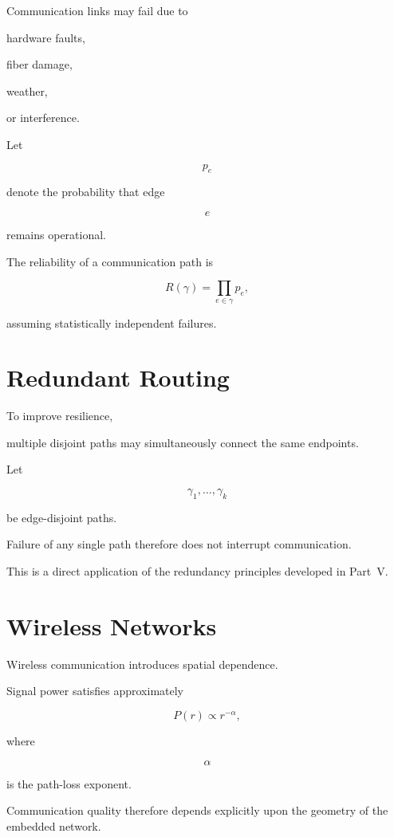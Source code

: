 \documentclass[11pt,fleqn]{book}
\numberwithin{equation}{chapter}
\theoremstyle{plain}
\theoremstyle{definition}
\theoremstyle{remark}
\begin{document}
Communication links may fail due to

hardware faults,

fiber damage,

weather,

or interference.

Let

\[
p_e
\]

denote the probability that edge

\[
e
\]

remains operational.

The reliability of a communication path is

\[
R(\gamma)
=
\prod_{e\in\gamma}
p_e,
\]

assuming statistically independent failures.


\section{Redundant Routing}

To improve resilience,

multiple disjoint paths may simultaneously connect the same endpoints.

Let

\[
\gamma_1,\ldots,\gamma_k
\]

be edge-disjoint paths.

Failure of any single path therefore does not interrupt communication.

This is a direct application of the redundancy principles developed in
Part~V.


\section{Wireless Networks}

Wireless communication introduces spatial dependence.

Signal power satisfies approximately

\[
P(r)
\propto
r^{-\alpha},
\]

where

\[
\alpha
\]

is the path-loss exponent.

Communication quality therefore depends explicitly upon the geometry of
the embedded network.
\end{document}

